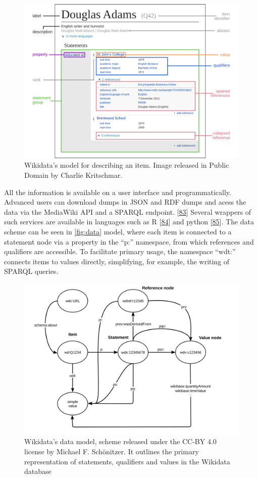 \begin{figure}
\hypertarget{fig:douglas_adams}{%
\centering
\includegraphics[width=0.85\columnwidth]{images/Datamodel_in_Wikidata.svg.png}
\caption{Wikidata's model for describing an item. Image released in Public Domain by Charlie Kritschmar.}\label{fig:douglas_adams}
}
\end{figure}

All the information is available on a user interface and programmatically.
Advanced users can download dumps in JSON and RDF dumps and acess the data via the MediaWiki API and a SPARQL endpoint. {[}\protect\hyperlink{ref-4wSLyAPr}{83}{]}
Several wrappers of such services are available in languages such as R {[}\protect\hyperlink{ref-1HghnypzG}{84}{]} and python {[}\protect\hyperlink{ref-VKWfrtR1}{85}{]}.
The data scheme can be seen in \ref{fig:data} model, where each item is connected to a statement node via a property in the ``p:'' namespace, from which references and qualifiers are accessible.
To facilitate primary usage, the namespace ``wdt:'' connects items to values directly, simplifying, for example, the writing of SPARQL queries.

\begin{figure}
\hypertarget{fig:datamodel}{%
\centering
\includegraphics[width=0.85\columnwidth]{images/Rdf_mapping-vector.svg.png}
\caption{Wikidata's data model, scheme released under the CC-BY 4.0 license by Michael F. Schönitzer. It outlines the primary representation of statements, qualifiers and values in the Wikidata database}\label{fig:datamodel}
}
\end{figure}

